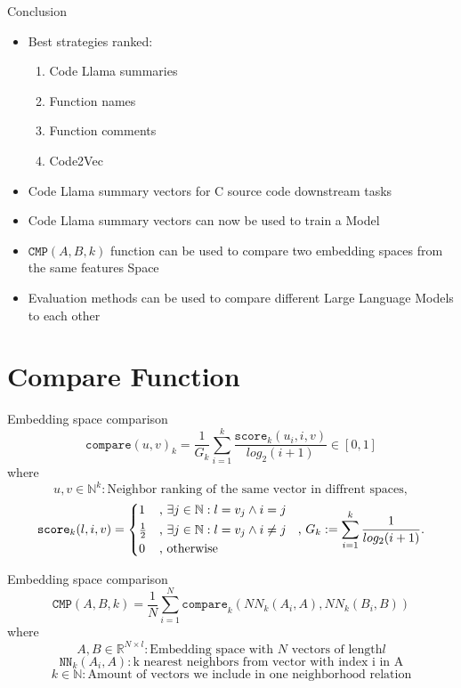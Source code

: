 \documentclass[aspectratio=1610,12pt]{beamer}
\begin{document}
\begin{frame}{Conclusion}
  \begin{itemize}
    \item Best strategies ranked: 
    \begin{enumerate}
      \item Code Llama summaries
      \item Function names
      \item Function comments
      \item Code2Vec
    \end{enumerate}
    \item Code Llama summary vectors for 
      C source code downstream tasks
    \item Code Llama summary vectors can now 
      be used to train a Model
  \item $\texttt{CMP}(A,B,k)$ function
    can be used to compare two embedding 
    spaces from the same features Space
  \item Evaluation methods can be used to 
    compare different Large Language Models to each other
  \end{itemize}
\end{frame}

\appendix
\section{Compare Function}
\begin{frame}[t]{Embedding space comparison}
  \[
    \texttt{compare}(u,v)_k = 
      \frac{1}{G_k} \sum^{k}_{i=1} 
      \frac{ \texttt{score}_{k}(u_i,i,v)}{log_2(i+1)} 
      \in [0,1]
  \]
  where
  \[ u,v \in \mathbb{N}^k: \text{Neighbor ranking of the same vector in diffrent spaces},\]
  \[
    \texttt{score}_k(l,i,v) = \begin{cases*} 
        1 & , $\exists j \in \mathbb{N}: l = v_j \land i = j$   \\
        \frac{1}{2} & , $\exists j \in \mathbb{N}: l = v_j \land i \neq j$\\
        0   & , \text{otherwise}
      \end{cases*}  \text{  , }
      G_k := \sum_{i=1}^{k} \frac{1}{log_2(i+1)}.
  \]
\end{frame}

\begin{frame}[t]{Embedding space comparison}
  \[
    \texttt{CMP}(A,B,k) = \frac{1}{N}\sum_{i = 1}^{N}
      \texttt{compare}_k(NN_k(A_i,A),NN_k(B_i, B))
  \]
  where 
  \[
    A,B \in \mathbb{R}^{N\times l}: \text{Embedding space with }
    N \text{ vectors of length} l
  \]
  \[
    \texttt{NN}_k(A_i, A): \text{k nearest neighbors from vector with index i in A}
  \]
  \[
    k \in \mathbb{N}: \text{Amount of vectors we include in one neighborhood relation}
  \]
\end{frame}
\end{document}
